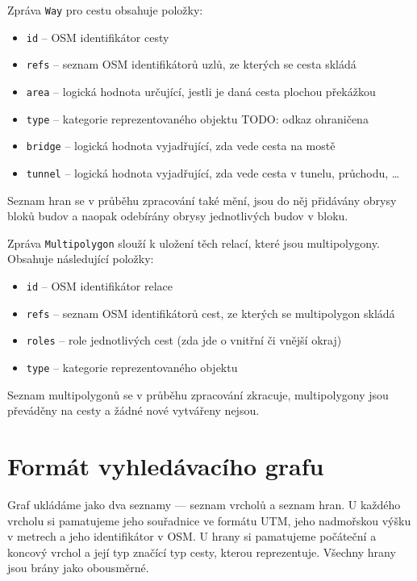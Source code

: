 Zpráva \verb|Way| pro cestu obsahuje položky:
\begin{itemize}
	\item \verb|id| -- OSM identifikátor cesty
	\item \verb|refs| -- seznam OSM identifikátorů uzlů, ze kterých se cesta
	skládá
	\item \verb|area| -- logická hodnota určující, jestli je daná cesta
	plochou
	překážkou
	\item \verb|type| -- kategorie reprezentovaného objektu TODO: odkaz
	ohraničena
	\item \verb|bridge| -- logická hodnota vyjadřující, zda vede cesta na mostě
	\item \verb|tunnel| -- logická hodnota vyjadřující, zda vede cesta v
	tunelu, průchodu, \dots
\end{itemize}
Seznam hran se v průběhu zpracování také mění, jsou do něj přidávány obrysy
bloků budov a naopak odebírány obrysy jednotlivých budov v bloku.

Zpráva \verb|Multipolygon| slouží k uložení těch relací, které jsou
multipolygony. Obsahuje následující položky:
\begin{itemize}
	\item \verb|id| -- OSM identifikátor relace
	\item \verb|refs| -- seznam OSM identifikátorů cest, ze kterých se
	multipolygon skládá
	\item \verb|roles| -- role jednotlivých cest (zda jde o vnitřní či vnější
	okraj)
	\item \verb|type| -- kategorie reprezentovaného objektu
\end{itemize}
Seznam multipolygonů se v průběhu zpracování zkracuje, multipolygony jsou
převáděny na cesty a žádné nové vytvářeny nejsou.



\section{Formát vyhledávacího grafu}
Graf ukládáme jako dva seznamy --- seznam vrcholů a seznam hran. U každého
vrcholu si pamatujeme jeho souřadnice ve formátu UTM, jeho nadmořskou výšku v
metrech a jeho identifikátor v OSM. U hrany si pamatujeme počáteční a koncový
vrchol a její typ značící typ cesty, kterou reprezentuje. Všechny hrany jsou
brány jako obousměrné.

